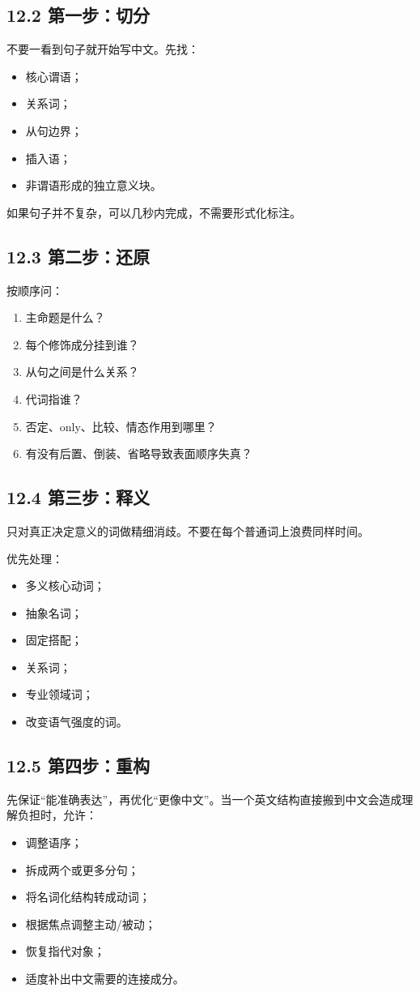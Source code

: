 \documentclass[11pt,a4paper]{ctexart}
\begin{document}
\subsection{12.2 第一步：切分}
不要一看到句子就开始写中文。先找：
\begin{itemize}
  \item 核心谓语；
  \item 关系词；
  \item 从句边界；
  \item 插入语；
  \item 非谓语形成的独立意义块。
\end{itemize}

如果句子并不复杂，可以几秒内完成，不需要形式化标注。

\subsection{12.3 第二步：还原}
按顺序问：
\begin{enumerate}
  \item 主命题是什么？
  \item 每个修饰成分挂到谁？
  \item 从句之间是什么关系？
  \item 代词指谁？
  \item 否定、only、比较、情态作用到哪里？
  \item 有没有后置、倒装、省略导致表面顺序失真？
\end{enumerate}

\subsection{12.4 第三步：释义}
只对真正决定意义的词做精细消歧。不要在每个普通词上浪费同样时间。

优先处理：
\begin{itemize}
  \item 多义核心动词；
  \item 抽象名词；
  \item 固定搭配；
  \item 关系词；
  \item 专业领域词；
  \item 改变语气强度的词。
\end{itemize}

\subsection{12.5 第四步：重构}
先保证“能准确表达”，再优化“更像中文”。当一个英文结构直接搬到中文会造成理解负担时，允许：
\begin{itemize}
  \item 调整语序；
  \item 拆成两个或更多分句；
  \item 将名词化结构转成动词；
  \item 根据焦点调整主动/被动；
  \item 恢复指代对象；
  \item 适度补出中文需要的连接成分。
\end{itemize}
\end{document}
